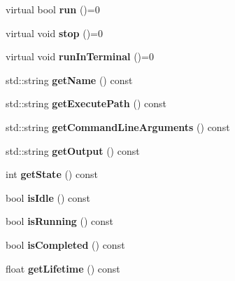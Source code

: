 \begin{DoxyCompactItemize}
virtual bool {\bfseries run} ()=0
\item 
\mbox{\label{classPlayerTask_ad0defdb52dd4d0b08a2f247f654738fc}} 
virtual void {\bfseries stop} ()=0
\item 
\mbox{\label{classPlayerTask_a149be49f504e7e5a965db58d96929cce}} 
virtual void {\bfseries run\+In\+Terminal} ()=0
\item 
\mbox{\label{classPlayerTask_ac79c070cc3ba5e7e6aafdbaa26117481}} 
std\+::string {\bfseries get\+Name} () const
\item 
\mbox{\label{classPlayerTask_aad12ef0725eaca21eda74dc4ebace746}} 
std\+::string {\bfseries get\+Execute\+Path} () const
\item 
\mbox{\label{classPlayerTask_a4f5be937b908196e00e201cbcf4ed6b1}} 
std\+::string {\bfseries get\+Command\+Line\+Arguments} () const
\item 
\mbox{\label{classPlayerTask_a009307953a06883eab6592f157fa1f60}} 
std\+::string {\bfseries get\+Output} () const
\item 
\mbox{\label{classPlayerTask_ab4619cf10e710aff6247b663c63ea142}} 
int {\bfseries get\+State} () const
\item 
\mbox{\label{classPlayerTask_ae83d64a140fd71f95d2a506a15793472}} 
bool {\bfseries is\+Idle} () const
\item 
\mbox{\label{classPlayerTask_ae0fc408de7dc1b8e159aa2e1d6bd264e}} 
bool {\bfseries is\+Running} () const
\item 
\mbox{\label{classPlayerTask_a88fe4e69d88c6a4c344ccf2cfe184d0d}} 
bool {\bfseries is\+Completed} () const
\item 
\mbox{\label{classPlayerTask_ab121eca893d0355b1ab1aca54b3958d4}} 
float {\bfseries get\+Lifetime} () const
\item 
\mbox{\label{classPlayerTask_abe7dc418af85b70defd8277b82be3434}} 

\end{DoxyCompactItemize}
